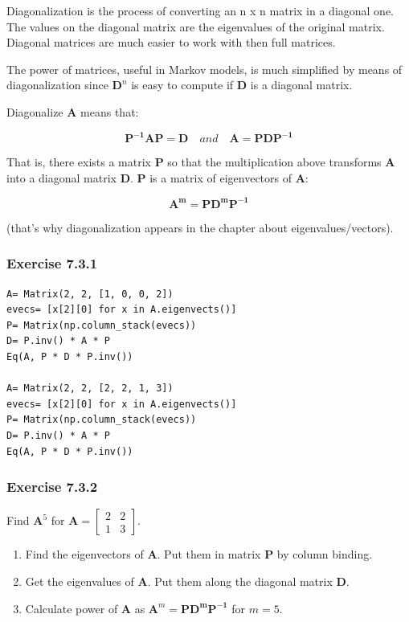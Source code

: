Diagonalization is the process of converting an n x n matrix in a diagonal one. The
values on the diagonal matrix are the eigenvalues of the original matrix. Diagonal
matrices are much easier to work with then full matrices.

The power of matrices, useful in Markov models, is much simplified by means of
diagonalization since $\mathbf{D}^n$ is easy to compute if \textbf{D} is a diagonal
matrix.

Diagonalize \textbf{A} means that:

$$
\mathbf{P^{-1} A P = D} \quad and \quad
\mathbf{A = P D P^{-1}}
$$



That is, there exists a matrix \textbf{P} so that the multiplication above transforms
\textbf{A} into a diagonal matrix \textbf{D}. \textbf{P} is a matrix of eigenvectors
of \textbf{A}:

$$
\mathbf{A^m = P  D^m  P^{-1}}
$$

(that's why diagonalization appears in the chapter about eigenvalues/vectors).

\subsubsection{Exercise 7.3.1}

\begin{verbatim}
A= Matrix(2, 2, [1, 0, 0, 2])
evecs= [x[2][0] for x in A.eigenvects()]
P= Matrix(np.column_stack(evecs))
D= P.inv() * A * P
Eq(A, P * D * P.inv())

A= Matrix(2, 2, [2, 2, 1, 3])
evecs= [x[2][0] for x in A.eigenvects()]
P= Matrix(np.column_stack(evecs))
D= P.inv() * A * P
Eq(A, P * D * P.inv())
\end{verbatim}

\subsubsection{Exercise 7.3.2}

Find $\mathbf{A}^5$ for $\mathbf{A} = \left[\begin{matrix}2 & 2\\1 & 3\end{matrix}\right]$.

\begin{enumerate}
\item Find the eigenvectors of \textbf{A}. Put them in matrix \textbf{P} by column binding.
\item Get the eigenvalues of \textbf{A}. Put them along the diagonal matrix \textbf{D}.
\item Calculate power of \textbf{A} as $\mathbf{A}^m = \mathbf{PD^mP^{-1}}$ for $m= 5$. 
\end{enumerate}

